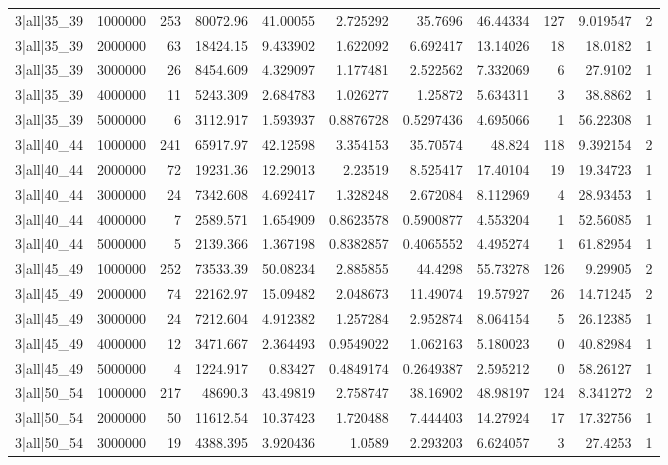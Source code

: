 \begin{tabular}{lrrrrrrrrrr}
3|all|35\_39 & 1000000 & 253 & 80072.96 & 41.00055 & 2.725292 & 35.7696 & 46.44334 & 127 & 9.019547 & 2 \\
3|all|35\_39 & 2000000 & 63 & 18424.15 & 9.433902 & 1.622092 & 6.692417 & 13.14026 & 18 & 18.0182 & 1 \\
3|all|35\_39 & 3000000 & 26 & 8454.609 & 4.329097 & 1.177481 & 2.522562 & 7.332069 & 6 & 27.9102 & 1 \\
3|all|35\_39 & 4000000 & 11 & 5243.309 & 2.684783 & 1.026277 & 1.25872 & 5.634311 & 3 & 38.8862 & 1 \\
3|all|35\_39 & 5000000 & 6 & 3112.917 & 1.593937 & 0.8876728 & 0.5297436 & 4.695066 & 1 & 56.22308 & 1 \\
3|all|40\_44 & 1000000 & 241 & 65917.97 & 42.12598 & 3.354153 & 35.70574 & 48.824 & 118 & 9.392154 & 2 \\
3|all|40\_44 & 2000000 & 72 & 19231.36 & 12.29013 & 2.23519 & 8.525417 & 17.40104 & 19 & 19.34723 & 1 \\
3|all|40\_44 & 3000000 & 24 & 7342.608 & 4.692417 & 1.328248 & 2.672084 & 8.112969 & 4 & 28.93453 & 1 \\
3|all|40\_44 & 4000000 & 7 & 2589.571 & 1.654909 & 0.8623578 & 0.5900877 & 4.553204 & 1 & 52.56085 & 1 \\
3|all|40\_44 & 5000000 & 5 & 2139.366 & 1.367198 & 0.8382857 & 0.4065552 & 4.495274 & 1 & 61.82954 & 1 \\
3|all|45\_49 & 1000000 & 252 & 73533.39 & 50.08234 & 2.885855 & 44.4298 & 55.73278 & 126 & 9.29905 & 2 \\
3|all|45\_49 & 2000000 & 74 & 22162.97 & 15.09482 & 2.048673 & 11.49074 & 19.57927 & 26 & 14.71245 & 2 \\
3|all|45\_49 & 3000000 & 24 & 7212.604 & 4.912382 & 1.257284 & 2.952874 & 8.064154 & 5 & 26.12385 & 1 \\
3|all|45\_49 & 4000000 & 12 & 3471.667 & 2.364493 & 0.9549022 & 1.062163 & 5.180023 & 0 & 40.82984 & 1 \\
3|all|45\_49 & 5000000 & 4 & 1224.917 & 0.83427 & 0.4849174 & 0.2649387 & 2.595212 & 0 & 58.26127 & 1 \\
3|all|50\_54 & 1000000 & 217 & 48690.3 & 43.49819 & 2.758747 & 38.16902 & 48.98197 & 124 & 8.341272 & 2 \\
3|all|50\_54 & 2000000 & 50 & 11612.54 & 10.37423 & 1.720488 & 7.444403 & 14.27924 & 17 & 17.32756 & 1 \\
3|all|50\_54 & 3000000 & 19 & 4388.395 & 3.920436 & 1.0589 & 2.293203 & 6.624057 & 3 & 27.4253 & 1 \\

\end{tabular}
